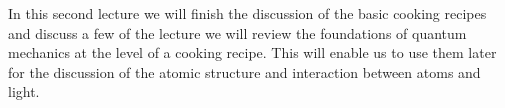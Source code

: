 In this second lecture we will finish the discussion of the basic cooking recipes and discuss a few of the  lecture we will review the foundations of quantum mechanics at the level of a cooking recipe. This will enable us to use them later for the discussion of the atomic structure and interaction between atoms and light.